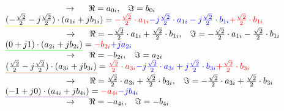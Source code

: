 $\hspace{2.5cm}\rightarrow \hspace{0.5cm} \Re=a_{0i}, \hspace{0.3cm}\Im=b_{0i}$\\

$\mathunderline{yellow}{(-\frac{\sqrt{2}}{2}-j\frac{\sqrt{2}}{2}) \cdot (a_{1i}+jb_{1i})} = \textcolor{red}{-\frac{\sqrt{2}}{2} \cdot a_{1i}} \textcolor{blue}{-j\frac{\sqrt{2}}{2} \cdot a_{1i} -j\frac{\sqrt{2}}{2} \cdot b_{1i}} \textcolor{red}{+\frac{\sqrt{2}}{2} \cdot b_{1i}}$\\

$\hspace{2.5cm}\rightarrow \hspace{0.5cm} \Re=-\frac{\sqrt{2}}{2} \cdot a_{1i} +\frac{\sqrt{2}}{2} \cdot b_{1i}, \hspace{0.3cm} \Im=-\frac{\sqrt{2}}{2} \cdot a_{1i} - \frac{\sqrt{2}}{2} \cdot b_{1i}$\\

$\mathunderline{green}{(0+j1) \cdot (a_{2i}+jb_{2i})} = \textcolor{red}{-b_{2i}}\textcolor{blue}{+ja_{2i}}$\\

$\hspace{2.5cm}\rightarrow \hspace{0.5cm} \Re=-b_{2i}, \hspace{0.3cm}\Im=a_{2i}$\\

$\mathunderline{cinnamon}{(\frac{\sqrt{2}}{2}-j\frac{\sqrt{2}}{2}) \cdot (a_{3i}+jb_{3i})} = \textcolor{red}{\frac{\sqrt{2}}{2} \cdot a_{3i}} \textcolor{blue}{-j\frac{\sqrt{2}}{2} \cdot a_{3i} +j\frac{\sqrt{2}}{2} \cdot b_{3i}} \textcolor{red}{+\frac{\sqrt{2}}{2} \cdot b_{3i}}$\\

$\hspace{2.5cm}\rightarrow \hspace{0.5cm} \Re=\frac{\sqrt{2}}{2} \cdot a_{3i} +\frac{\sqrt{2}}{2} \cdot b_{3i}, \hspace{0.3cm} \Im=-\frac{\sqrt{2}}{2} \cdot a_{3i} + \frac{\sqrt{2}}{2} \cdot b_{3i}$\\

$\mathunderline{lila}{(-1+j0) \cdot (a_{4i}+jb_{4i})} = \textcolor{red}{-a_{4i}}\textcolor{blue}{-jb_{4i}}$\\

$\hspace{2.5cm}\rightarrow \hspace{0.5cm} \Re=-a_{4i}, \hspace{0.3cm}\Im=-b_{4i}$\\

